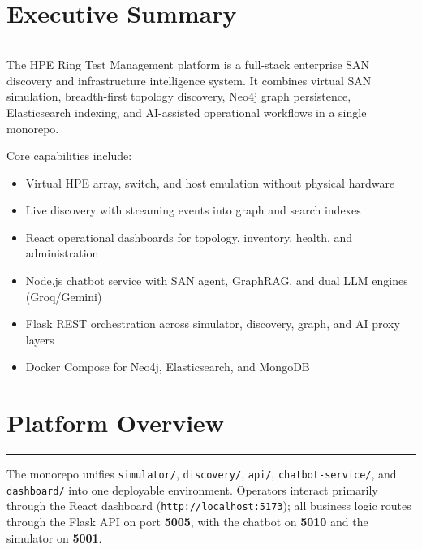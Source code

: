 \documentclass[11pt,a4paper]{article}
\begin{document}
\tableofcontents
\newpage


\section{Executive Summary}

\vspace{0.3cm}\hrule\vspace{0.6cm}

The HPE Ring Test Management platform is a full-stack enterprise SAN discovery and infrastructure intelligence system. It combines virtual SAN simulation, breadth-first topology discovery, Neo4j graph persistence, Elasticsearch indexing, and AI-assisted operational workflows in a single monorepo.

Core capabilities include:

\begin{itemize}[leftmargin=1.5cm]
    \item Virtual HPE array, switch, and host emulation without physical hardware
    \item Live discovery with streaming events into graph and search indexes
    \item React operational dashboards for topology, inventory, health, and administration
    \item Node.js chatbot service with SAN agent, GraphRAG, and dual LLM engines (Groq/Gemini)
    \item Flask REST orchestration across simulator, discovery, graph, and AI proxy layers
    \item Docker Compose for Neo4j, Elasticsearch, and MongoDB
\end{itemize}


\section{Platform Overview}

\vspace{0.3cm}\hrule\vspace{0.6cm}

The monorepo unifies \texttt{simulator/}, \texttt{discovery/}, \texttt{api/}, \texttt{chatbot-service/}, and \texttt{dashboard/} into one deployable environment. Operators interact primarily through the React dashboard (\texttt{http://localhost:5173}); all business logic routes through the Flask API on port \textbf{5005}, with the chatbot on \textbf{5010} and the simulator on \textbf{5001}.
\end{document}

